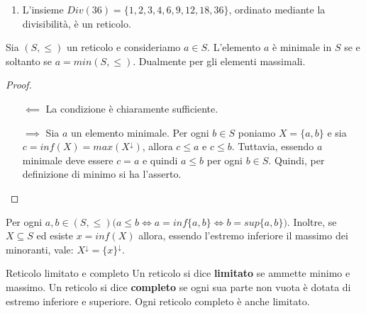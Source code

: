 \begin{example}
\begin{enumerate}
\begin{center}
	\end{center}
	\item L'insieme $Div(36) = \{1,2,3,4,6,9,12,18,36\}$, ordinato mediante la divisibilità, è un reticolo. 
\end{enumerate}
\end{example}



\begin{propbox}
	Sia $(S,\leq)$ un reticolo e consideriamo $a \in S$. L'elemento $a$ è minimale in $S$ se e soltanto se $a = min(S,\leq)$. Dualmente per gli elementi massimali.
\end{propbox}

\begin{proof}
	\begin{itemize}
		\item[$\impliedby$] La condizione è chiaramente sufficiente. 
		\item[$\implies$] Sia $a$ un elemento minimale. Per ogni $b \in S$ poniamo $X = \{a,b\}$ e sia $c = inf (X) = max (X^{\downarrow})$, allora $c  \leq  a $ e $c \leq b$. Tuttavia, essendo $a$ minimale deve essere $c=a$ e quindi $a \leq b$ per ogni $b \in S$. Quindi, per definizione di minimo si ha l'asserto.
	\end{itemize}
\end{proof}

\begin{osservation}\label{oss:min_inf}
	Per ogni $a,b \in (S,\leq)\bigl( a \leq b \iff a = inf\{a,b\} \iff b= sup \{a,b\} \bigr)$. Inoltre, se $X \subseteq S$ ed esiste $x= inf(X)$ allora, essendo l'estremo inferiore il massimo dei minoranti, vale: $X^{\downarrow} = \{x\}^{\downarrow}$.
\end{osservation}

\begin{defbox}{Reticolo limitato e completo}
	Un reticolo si dice \textbf{limitato} se ammette minimo e massimo. Un reticolo si dice \textbf{completo} se ogni sua parte non vuota è dotata di estremo inferiore e superiore. Ogni reticolo completo è anche limitato.
\end{defbox}

